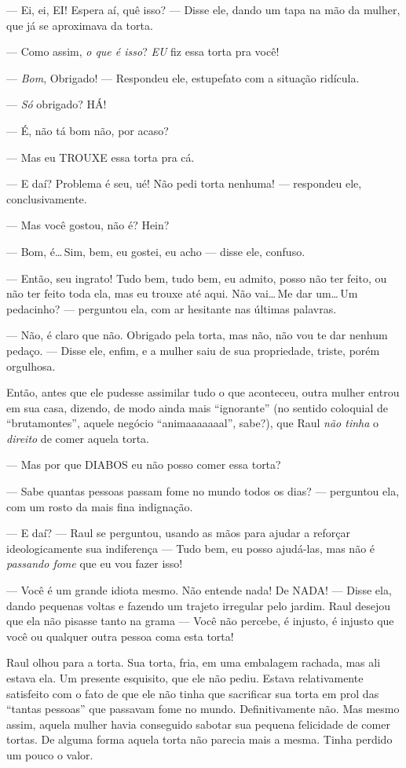 --- Ei, ei, EI! Espera aí, quê isso? --- Disse ele, dando um tapa na mão da mulher, que já se aproximava da torta.

--- Como assim, \emph{o que é isso}? \emph{EU} fiz essa torta pra você!

--- \emph{Bom}, Obrigado! --- Respondeu ele, estupefato com a situação ridícula.

--- \emph{Só} obrigado? HÁ!

--- É, não tá bom não, por acaso?

--- Mas eu TROUXE essa torta pra cá.

--- E daí? Problema é seu, ué! Não pedi torta nenhuma! --- respondeu ele, conclusivamente.

--- Mas você gostou, não é? Hein?

--- Bom, é\ldots\,Sim, bem, eu gostei, eu acho --- disse ele, confuso.

--- Então, seu ingrato! Tudo bem, tudo bem, eu admito, posso não ter feito, ou não ter feito toda ela, mas eu trouxe até aqui. Não vai\ldots\,Me dar um\ldots\,Um pedacinho? --- perguntou ela, com ar hesitante nas últimas palavras.

--- Não, é claro que não. Obrigado pela torta, mas não, não vou te dar nenhum pedaço. --- Disse ele, enfim, e a mulher saiu de sua propriedade, triste, porém orgulhosa.

Então, antes que ele pudesse assimilar tudo o que aconteceu, outra mulher entrou em sua casa, dizendo, de modo ainda mais ``ignorante'' (no sentido coloquial de ``brutamontes'', aquele negócio ``animaaaaaaal'', sabe?), que Raul \emph{não tinha} o \emph{direito} de comer aquela torta.

--- Mas por que DIABOS eu não posso comer essa torta?

--- Sabe quantas pessoas passam fome no mundo todos os dias? --- perguntou ela, com um rosto da mais fina indignação.

--- E daí? --- Raul se perguntou, usando as mãos para ajudar a reforçar ideologicamente sua indiferença --- Tudo bem, eu posso ajudá-las, mas não é \emph{passando fome} que eu vou fazer isso!

--- Você é um grande idiota mesmo. Não entende nada! De NADA! --- Disse ela, dando pequenas voltas e fazendo um trajeto irregular pelo jardim. Raul desejou que ela não pisasse tanto na grama --- Você não percebe, é injusto, é injusto que você ou qualquer outra pessoa coma esta torta!

Raul olhou para a torta. Sua torta, fria, em uma embalagem rachada, mas ali estava ela. Um presente esquisito, que ele não pediu. Estava relativamente satisfeito com o fato de que ele não tinha que sacrificar sua torta em prol das ``tantas pessoas'' que passavam fome no mundo. Definitivamente não. Mas mesmo assim, aquela mulher havia conseguido sabotar sua pequena felicidade de comer tortas. De alguma forma aquela torta não parecia mais a mesma. Tinha perdido um pouco o valor.

